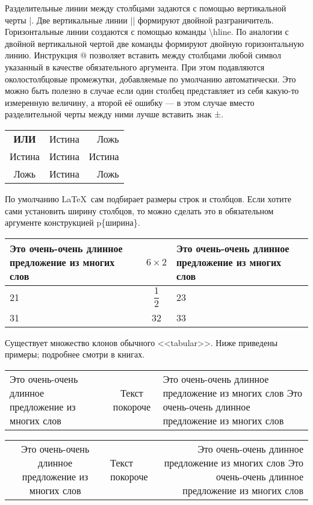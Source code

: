 \documentclass[a4paper,12pt]{article} %
\begin{document}
Разделительные линии между столбцами задаются с помощью вертикальной черты |. Две вертикальные линии || формируют двойной разграничитель. Горизонтальные линии создаются с помощью команды \textbackslash hline. По аналогии с двойной вертикальной чертой две команды формируют двойную горизонтальную линию. Инструкция @{} позволяет вставить между столбцами любой символ указанный в
качестве обязательного аргумента. При этом подавляются околостолбцовые промежутки, добавляемые по умолчанию автоматически. Это можно быть полезно в
случае если один столбец представляет из себя какую-то измеренную величину, а
второй её ошибку — в этом случае вместо разделительной черты между ними лучше
вставить знак ±.

\begin{tabular}{c||p{2cm}@{$\pm$\ }r|}
	\textbf{ИЛИ} & Истина & Ложь \\[2mm]
	\cline{2-3}
	Истина & Истина & Истина \\
	\cline{1-1}\cline{3-3}
	Ложь & Истина & Ложь\\ \cline{2-2}
\end{tabular}


По умолчанию \LaTeX \ сам подбирает размеры строк и столбцов. Если хотите сами установить ширину столбцов, то можно сделать это в обязательном аргументе конструкцией p\{ширина\}.

\begin{tabular}{|p{4cm}cp{7cm}|}
	\hline 
	Это очень-очень длинное предложение из многих слов & $6 \times 2$ & Это очень-очень длинное предложение из многих слов \\ \hline
	21 & $\dfrac{1}{2}$ & 23 \\[4mm] 
	\hline 
	31 & 32 & 33 \\
	\hline
\end{tabular}

Существует множество клонов обычного <<tabular>>. Ниже приведены примеры; подробнее смотри в книгах.

\begin{tabularx}{\textwidth}{X|c|X} %
	\hline
	Это очень-очень длинное предложение из многих слов & Текст покороче & Это очень-очень длинное предложение из многих слов Это очень-очень длинное предложение из многих слов
\end{tabularx}

\begin{tabulary}{\textwidth}{C|J|R} %
	\hline
	Это очень-очень длинное предложение из многих слов & Текст покороче & Это очень-очень длинное предложение из многих слов Это очень-очень длинное предложение из многих слов
\end{tabulary}
\end{document}
